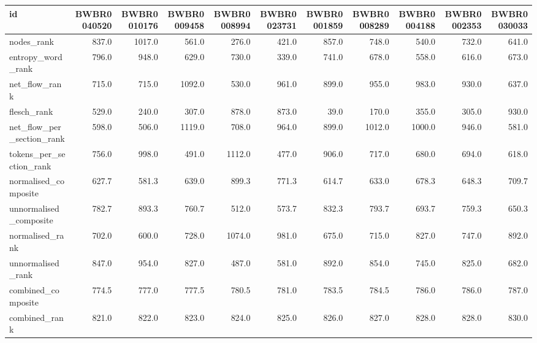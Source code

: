 \begin{tabular}{lrrrrrrrrrr}
\toprule
id & BWBR0040520 & BWBR0010176 & BWBR0009458 & BWBR0008994 & BWBR0023731 & BWBR0001859 & BWBR0008289 & BWBR0004188 & BWBR0002353 & BWBR0030033 \\
\midrule
nodes\_rank & 837.0 & 1017.0 & 561.0 & 276.0 & 421.0 & 857.0 & 748.0 & 540.0 & 732.0 & 641.0 \\
\cline{1-11}
entropy\_word\_rank & 796.0 & 948.0 & 629.0 & 730.0 & 339.0 & 741.0 & 678.0 & 558.0 & 616.0 & 673.0 \\
\cline{1-11}
net\_flow\_rank & 715.0 & 715.0 & 1092.0 & 530.0 & 961.0 & 899.0 & 955.0 & 983.0 & 930.0 & 637.0 \\
\cline{1-11}
flesch\_rank & 529.0 & 240.0 & 307.0 & 878.0 & 873.0 & 39.0 & 170.0 & 355.0 & 305.0 & 930.0 \\
\cline{1-11}
net\_flow\_per\_section\_rank & 598.0 & 506.0 & 1119.0 & 708.0 & 964.0 & 899.0 & 1012.0 & 1000.0 & 946.0 & 581.0 \\
\cline{1-11}
tokens\_per\_section\_rank & 756.0 & 998.0 & 491.0 & 1112.0 & 477.0 & 906.0 & 717.0 & 680.0 & 694.0 & 618.0 \\
\cline{1-11}
normalised\_composite & 627.7 & 581.3 & 639.0 & 899.3 & 771.3 & 614.7 & 633.0 & 678.3 & 648.3 & 709.7 \\
\cline{1-11}
unnormalised\_composite & 782.7 & 893.3 & 760.7 & 512.0 & 573.7 & 832.3 & 793.7 & 693.7 & 759.3 & 650.3 \\
\cline{1-11}
normalised\_rank & 702.0 & 600.0 & 728.0 & 1074.0 & 981.0 & 675.0 & 715.0 & 827.0 & 747.0 & 892.0 \\
\cline{1-11}
unnormalised\_rank & 847.0 & 954.0 & 827.0 & 487.0 & 581.0 & 892.0 & 854.0 & 745.0 & 825.0 & 682.0 \\
\cline{1-11}
combined\_composite & 774.5 & 777.0 & 777.5 & 780.5 & 781.0 & 783.5 & 784.5 & 786.0 & 786.0 & 787.0 \\
\cline{1-11}
combined\_rank & 821.0 & 822.0 & 823.0 & 824.0 & 825.0 & 826.0 & 827.0 & 828.0 & 828.0 & 830.0 \\
\cline{1-11}
\bottomrule
\end{tabular}
